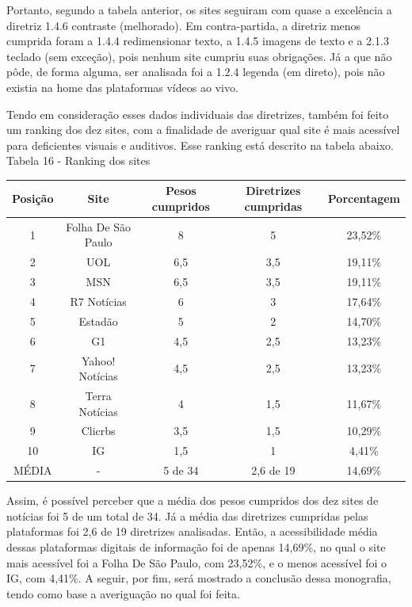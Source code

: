 \documentclass[a4paper]{article}
\begin{document}
\begin{titlepage}
Portanto, segundo a tabela anterior, os sites seguiram com quase a excelência a diretriz 1.4.6 contraste (melhorado). Em contra-partida, a diretriz menos cumprida foram a 1.4.4 redimensionar texto, a 1.4.5 imagens de texto e a 2.1.3 teclado (sem exceção), pois nenhum site cumpriu suas obrigações. Já a que não pôde, de forma alguma, ser analisada foi a 1.2.4 legenda (em direto), pois não existia na home das plataformas vídeos ao vivo.

Tendo em consideração esses dados individuais das diretrizes, também foi feito um ranking dos dez sites, com a finalidade de averiguar qual site é mais acessível para deficientes visuais e auditivos. Esse ranking está descrito na tabela abaixo.\\

Tabela 16 - Ranking dos sites\\[-1cm]
\begin{center}
	\fontsize{8pt}{8pt}\selectfont	
	\begin{longtable}{|c|c|c|c|c|}
		\hline
		Posição & Site & Pesos cumpridos & Diretrizes cumpridas & Porcentagem\\
		\hline
		1 & Folha De São Paulo & 8 & 5 & 23,52\%\\
		\hline
		2 & UOL & 6,5 & 3,5 & 19,11\%\\
		\hline
		3 & MSN & 6,5 & 3,5 & 19,11\%\\
		\hline
		4 & R7 Notícias & 6 & 3 & 17,64\%\\
		\hline
		5 & Estadão & 5 & 2 & 14,70\%\\
		\hline
		6 & G1 & 4,5 & 2,5 & 13,23\%\\
		\hline
		7 & Yahoo! Notícias & 4,5 & 2,5 & 13,23\%\\
		\hline
		8 & Terra Notícias & 4 & 1,5 & 11,67\%\\
		\hline
		9 & Clicrbs & 3,5 & 1,5 & 10,29\%\\
		\hline
		10 & IG & 1,5 & 1 & 4,41\%\\
		\hline
		MÉDIA & - & 5 de 34 & 2,6 de 19 & 14,69\%\\
		\hline
	\end{longtable}
\end{center}

Assim, é possível perceber que a média dos pesos cumpridos dos dez sites de notícias foi 5 de um total de 34. Já a média das diretrizes cumpridas pelas plataformas foi 2,6 de 19 diretrizes analisadas. Então, a acessibilidade média dessas plataformas digitais de informação foi de apenas 14,69\%, no qual o site mais acessível foi a Folha De São Paulo, com 23,52\%, e o menos acessível foi o IG, com 4,41\%. A seguir, por fim, será mostrado a conclusão dessa monografia, tendo como base a averiguação no qual foi feita.


\end{titlepage}
\end{document}
